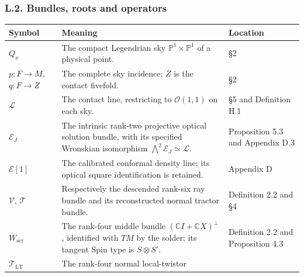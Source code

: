 \documentclass[
  english,
  11pt,
  reqno]{amsart}
\newcounter{none} %
\begin{document}
\protect{}\label{sec:gg-notation-bundles}

\subsubsection{L.2. Bundles, roots and
operators}\label{l.2.-bundles-roots-and-operators}

{\def\LTcaptype{none} %
\begin{longtable}[]{@{}
  >{\raggedright\arraybackslash}p{}
  >{\raggedright\arraybackslash}p{}
  >{\raggedright\arraybackslash}p{}@{}}
\toprule\noalign{}
\begin{minipage}[b]{\linewidth}\raggedright
Symbol
\end{minipage} & \begin{minipage}[b]{\linewidth}\raggedright
Meaning
\end{minipage} & \begin{minipage}[b]{\linewidth}\raggedright
Location
\end{minipage} \\
\midrule\noalign{}
\endhead
\bottomrule\noalign{}
\endlastfoot
\(Q_x\) & The compact Legendrian sky \(\mathbb P^1\times\mathbb P^1\) of
a physical point. & §2 \\
\(p:F\to M\), \(q:F\to Z\) & The complete sky incidence; \(Z\) is the
contact fivefold. & §2 \\
\(\mathcal L\) & The contact line, restricting to \(\mathcal O(1,1)\) on
each sky. & §5 and Definition H.1 \\
\(\mathcal E_J\) & The intrinsic rank-two projective optical solution
bundle, with its specified Wronskian isomorphism
\(\bigwedge^2\mathcal E_J\simeq\mathcal L\). & Proposition 5.3 and
Appendix D.3 \\
\(\mathcal E[1]\) & The calibrated conformal density line; its optical
square identification is retained. & Appendix D \\
\(\mathcal V\), \(\mathcal T\) & Respectively the descended rank-six ray
bundle and its reconstructed normal tractor bundle. & Definition 2.2 and
§4 \\
\(W_{\mathrm{scr}}\) & The rank-four middle bundle
\((\mathbb CI+\mathbb CX)^\perp\), identified with \(TM\) by the solder;
its tangent Spin type is \(S\otimes S'\). & Definition 2.2 and
Proposition 4.3 \\
\(\mathcal T_{\mathrm{LT}}\) & The rank-four normal local-twistor

\end{longtable}}
\end{document}
